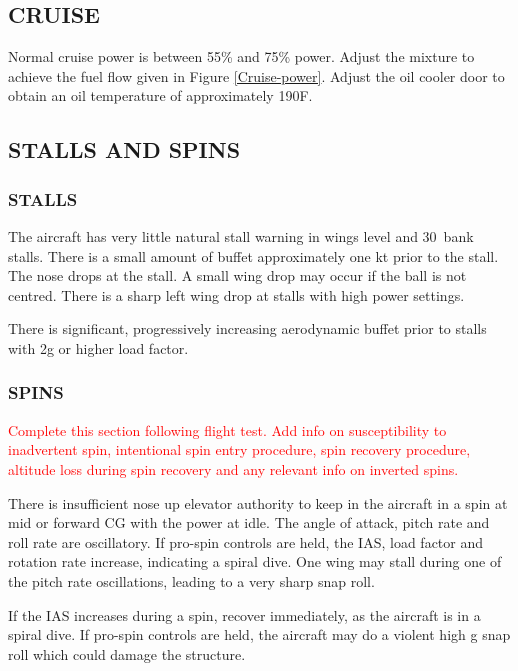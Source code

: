\subsection{CRUISE}
Normal cruise power is between 55\% and 75\% power. Adjust the mixture to achieve the fuel flow given in Figure \ref{Cruise-power}. Adjust the oil cooler door to obtain an oil temperature of approximately 190\textdegree F.
\subsection{STALLS AND SPINS}

\subsubsection{STALLS} The aircraft has very little natural stall warning in wings level and 30\textdegree \ bank stalls. There is a small amount of buffet approximately one kt prior to the stall. The nose drops at the stall. A small wing drop may occur if the ball is not centred. There is a sharp left wing drop at stalls with high power settings.

There is significant, progressively increasing aerodynamic buffet prior to stalls with 2g or higher load factor.

\subsubsection{SPINS}\textcolor{red}{Complete this section following flight test. Add info on susceptibility to inadvertent spin, intentional spin entry procedure, spin recovery procedure, altitude loss during spin recovery and any relevant info on inverted spins.}

There is insufficient nose up elevator authority to keep in the aircraft in a spin at mid or forward CG with the power at idle. The angle of attack, pitch rate and roll rate are oscillatory. If pro-spin controls are held, the IAS, load factor and rotation rate increase, indicating a spiral dive. One wing may stall during one of the pitch rate oscillations, leading to a very sharp snap roll.

\begin{Note}[Caution]
If the IAS increases during a spin, recover immediately, as the aircraft is in a spiral dive. If pro-spin controls are held, the aircraft may do a violent high g snap roll which could damage the structure. 
\end{Note}

